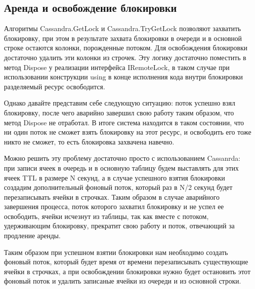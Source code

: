 \subsection{Аренда и освобождение блокировки}

Алгоритмы Cassandra.GetLock и Cassandra.TryGetLock позволяют захватить блокировку, при этом в результате захвата блокировки в очереди и в основной строке остаются колонки, порожденные потоком. Для освобождения блокировки достаточно удалить эти колонки из строчек. Эту логику достаточно поместить в метод Dispose у реализации интерфейса IRemoteLock, в таком случае при использовании конструкции using в конце исполнения кода внутри блокировки разделяемый ресурс освободится.

Однако давайте представим себе следующую ситуацию: поток успешно взял блокировку, после чего аварийно завершил свою работу таким образом, что метод Dispose не отработал. В итоге система находится в таком состоянии, что ни один поток не сможет взять блокировку на этот ресурс, и освободить его тоже никто не сможет, то есть блокировка захвачена навечно.

Можно решить эту проблему достаточно просто с использованием Cassanrda: при записи ячеек в очередь и в основную таблицу будем выставлять для этих ячеек TTL в размере N секунд, а в случае успешного взятия блокировки создадим дополнительный фоновый поток, который раз в N/2 секунд будет перезаписывать ячейки в строчках. Таким образом в случае аварийного завершения процесса, поток которого захватил блокировку и не успел ее освободить, ячейки исчезнут из таблицы, так как вместе с потоком, удерживающим блокировку, прекратит свою работу и поток, отвечающий за продление аренды.

Таким образом при успешном взятии блокировки нам необходимо создать фоновый поток, который будет время от времени перезаписывать существующие ячейки в строчках, а при освобождении блокировки нужно будет остановить этот фоновый поток и удалить записаные ячейки из очереди и из основной строки.